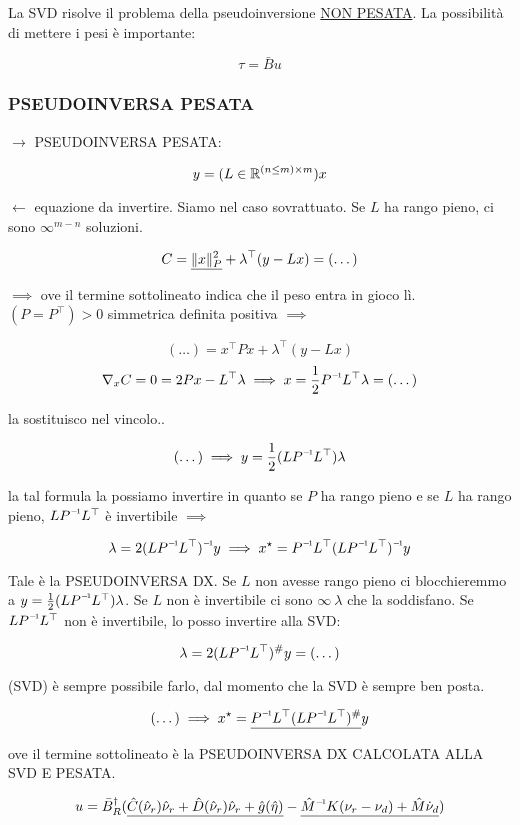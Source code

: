 La SVD risolve il problema della pseudoinversione \underline{NON PESATA}. La possibilità di mettere i pesi è importante:

\[
	\tau=\bar{B}u
\]

\subsubsection{PSEUDOINVERSA PESATA}

$\rightarrow$ PSEUDOINVERSA PESATA:

\[
	y = (L\in\mathbb{R}^{(n\leq m)\times m})x
\]

$\leftarrow$ equazione da invertire. Siamo nel caso sovrattuato. Se $L$ ha rango pieno, ci sono $\infty^{m-n}$ soluzioni. 

\[
	C = \underline{\lVert x\rVert^2_P} + \lambda^\top(y-Lx) = (\dots)
\]

$\implies$ ove il termine sottolineato indica che il peso entra in gioco lì. $(P=P^\top)>0$ simmetrica definita positiva $\implies$

\[
	(\dots) = x^\top Px + \lambda^\top(y-Lx)
\]
\[
	\nabla_x{C} = 0 = 2Px - L^\top\lambda \implies x=\frac{1}{2}\inv{P}L^\top\lambda = (\dots)
\]

la sostituisco nel vincolo..

\[
	(\dots) \implies y = \frac{1}{2}(L\inv{P}L^\top)\lambda
\]

la tal formula la possiamo invertire in quanto se $P$ ha rango pieno e se $L$ ha rango pieno, $L\inv{P}L^\top$ è invertibile $\implies$

\[
	\lambda = 2\inv{(L\inv{P}L^\top)}y \implies x^\star = \inv{P}L^\top\inv{(L\inv{P}L^\top)}y
\]

Tale è la PSEUDOINVERSA DX. Se $L$ non avesse rango pieno ci blocchieremmo a $y= \frac{1}{2}(L\inv{P}L^\top)\lambda$. Se $L$ non è invertibile ci sono $\infty\ \lambda$ che la soddisfano. Se $L\inv{P}L^\top$ non è invertibile, lo posso invertire alla SVD:

\[
	\lambda=2(L\inv{P}L^\top)^\# y = (\dots) 
\]

(SVD) è sempre possibile farlo, dal momento che la SVD è sempre ben posta. 

\[
	(\dots) \implies x^\star = \underline{\inv{P}L^\top(L\inv{P}L^\top)^\#} y
\]

ove il termine sottolineato è la PSEUDOINVERSA DX CALCOLATA ALLA SVD E PESATA.

\[
	u = \bar{B}_R^\dag(\underline{\hat{C}(\hat{\nu}_r)\hat{\nu}_r + \hat{D}(\hat{\nu}_r)\hat{\nu}_r + \hat{g}(\hat{\eta})} - \underline{\inv{\hat{M}}K(\nu_r-\nu_d) + \hat{M}\dot{\nu}_d})
\]


